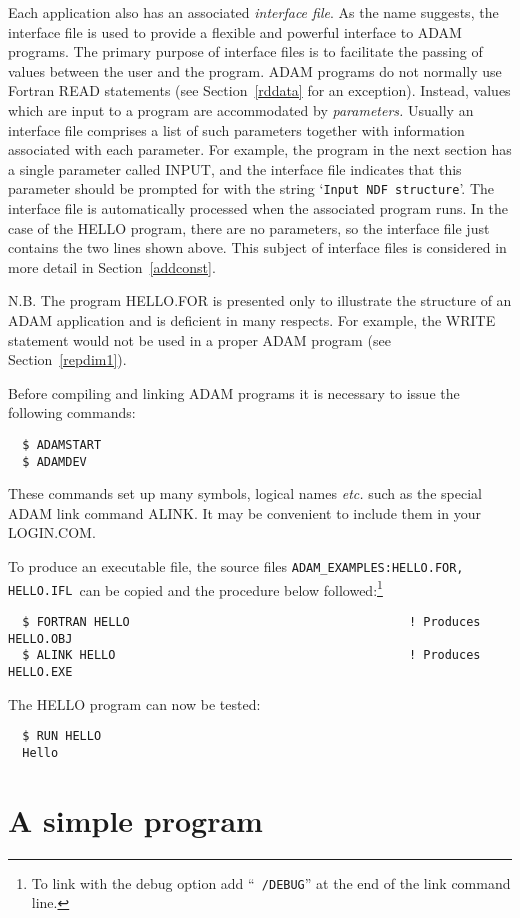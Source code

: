 Each application also has an associated {\sl interface file}.
As the name suggests, the interface file is used to provide a flexible
and powerful interface to  ADAM programs.
The primary purpose of interface files is to facilitate the passing
of values between the user and the program.
ADAM programs do not normally use Fortran READ statements 
(see Section~\ref{rddata} for an exception).
Instead, values which are input to  a program are accommodated by 
{\sl parameters.} 
Usually an interface file comprises  a list of  
such parameters together with information associated with each parameter.
For example, the program in the next section has a single parameter
called INPUT, and the interface file indicates that this  parameter should
be prompted for with the string `{\tt Input NDF structure}'.
The interface file is automatically processed when the associated program
runs.
In the case of the HELLO program, there are no parameters, so the interface 
file just contains the two lines shown above.
This subject of interface files is considered in more detail in 
Section~\ref{addconst}.

N.B. The program HELLO.FOR is presented only to illustrate the 
structure of an ADAM application and is deficient in many respects.
For example, the WRITE statement would not be used in 
a proper ADAM program (see Section~\ref{repdim1}).

Before compiling and linking ADAM programs it is necessary to issue the 
following commands:
\begin{verbatim}
  $ ADAMSTART
  $ ADAMDEV
\end{verbatim}
These commands set up many symbols, logical names {\it etc.}
such as the special ADAM link command ALINK.
It may be convenient to include them in your LOGIN.COM.

To produce an executable file, the 
source files {\tt ADAM\_EXAMPLES:HELLO.FOR, HELLO.IFL}\ can be copied and the
procedure below  followed:\footnote{To link with the debug option add 
``{\tt~/DEBUG}'' at the end of the link 
command line.}
\begin{verbatim}
  $ FORTRAN HELLO                                       ! Produces HELLO.OBJ
  $ ALINK HELLO                                         ! Produces HELLO.EXE
\end{verbatim}
The HELLO program can now be tested:
\begin{verbatim}
  $ RUN HELLO
  Hello
\end{verbatim}

\newpage
\section{A simple program\label{repdim}}

